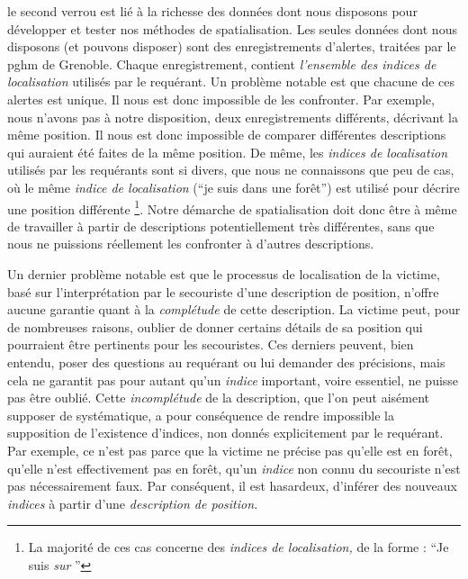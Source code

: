 le second verrou est lié à la richesse des données dont nous disposons
pour développer et tester nos méthodes de spatialisation. Les seules
données dont nous disposons (et pouvons disposer) sont des
enregistrements d'alertes, traitées par le \ac{pghm} de
Grenoble. Chaque enregistrement, contient \emph{l'ensemble des indices
  de localisation} utilisés par le requérant. Un problème notable est
que chacune de ces alertes est unique. Il nous est donc impossible de
les confronter. Par exemple, nous n'avons pas à notre disposition,
deux enregistrements différents, décrivant la même position. Il nous
est donc impossible de comparer différentes descriptions qui auraient
été faites de la même position. De même, les \emph{indices de
  localisation} utilisés par les requérants sont si divers, que nous
ne connaissons que peu de cas, où le même \emph{indice de
  localisation} (\eg \enquote{je suis dans une forêt}) est utilisé
pour décrire une position différente \footnote{La majorité de ces cas
  concerne des \emph{indices de localisation,} de la forme :
  \enquote{Je suis \emph{sur} }}. Notre démarche de spatialisation doit
donc être à même de travailler à partir de descriptions
potentiellement très différentes, sans que nous ne puissions
réellement les confronter à d'autres descriptions.

Un dernier problème notable est que le processus de localisation de la
victime, basé sur l'interprétation par le secouriste d'une description
de position, n'offre aucune garantie quant à la \emph{complétude} de
cette description. La victime peut, pour de nombreuses raisons,
oublier de donner certains détails de sa position qui pourraient être
pertinents pour les secouristes. Ces derniers peuvent, bien entendu,
poser des questions au requérant ou lui demander des précisions, mais
cela ne garantit pas pour autant qu'un \emph{indice} important, voire
essentiel, ne puisse pas être oublié. Cette \emph{incomplétude} de la
description, que l'on peut aisément supposer de systématique, a pour
conséquence de rendre impossible la supposition de l’existence
d'indices, non donnés explicitement par le requérant. Par exemple, ce
n'est pas parce que la victime ne précise pas qu'elle est en forêt,
qu'elle n'est effectivement pas en forêt, \ie qu'un \emph{indice} non
connu du secouriste n'est pas nécessairement faux. Par conséquent, il
est hasardeux, d'inférer des nouveaux \emph{indices} à partir d'une
\emph{description de position.}

